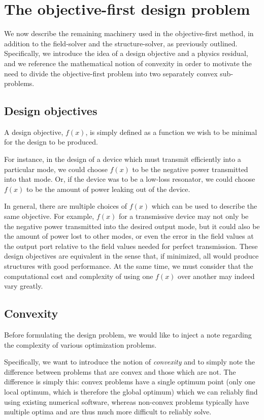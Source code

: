 
\section{The objective-first design problem}
We now describe the remaining machinery used in the objective-first method,
    in addition to the field-solver and the structure-solver,
    as previously outlined.
Specifically, we introduce the idea of a design objective and a physics residual,
    and we reference the mathematical notion of convexity
    in order to motivate the need to divide the 
    objective-first problem into two separately convex sub-problems.

\subsection{Design objectives} \label{sec:desobj}
A design objective, $f(x)$, is simply defined as
    a function we wish to be minimal 
    for the design to be produced.

For instance, in the design of a device
    which must transmit efficiently into a particular mode,
    we could choose $f(x)$ to be the negative power transmitted into that mode.
Or, if the device was to be a low-loss resonator,
    we could choose $f(x)$ to be the amount of power leaking 
    out of the device.

In general, there are multiple choices of $f(x)$
    which can be used to describe the same objective.
For example, $f(x)$ for a transmissive device 
    may not only be the negative power transmitted into the desired output mode,
    but it could also be the amount of power lost to other modes,
    or even the error in the field values at the output port
    relative to the field values needed for perfect transmission.
These design objectives are equivalent in the sense that, if minimized, 
    all would produce structures with good performance.
At the same time, we must consider that the computational cost and complexity
    of using one $f(x)$ over another may indeed vary greatly.

\subsection{Convexity}
Before formulating the design problem,
    we would like to inject a note regarding the complexity of various 
    optimization problems.

Specifically, we want to introduce the notion of \emph{convexity} %
    and to simply note the difference between problems that
    are convex and those which are not.
The difference is simply this:
    convex problems have a single optimum point
    (only one local optimum, which is therefore the global optimum)
    which we can reliably find using existing numerical software,
    whereas non-convex problems typically have multiple optima 
    and are thus much more difficult to reliably solve.

